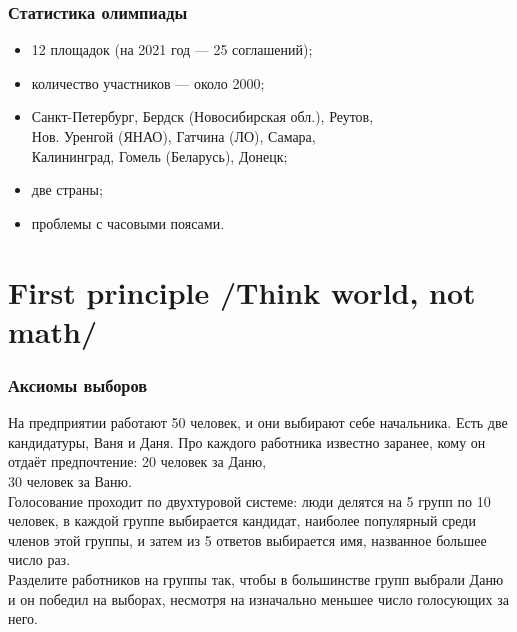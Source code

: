 \documentclass[aspectratio=1610,12pt]{beamer}
\def\uslx#1{\vspace{-6mm} \begin{block}{\vspace*{-3ex}} #1 \end{block}}
\begin{document}
\begin{frame}\frametitle{Статистика олимпиады}
\begin{itemize}
	\item 12 площадок (на 2021 год — 25 соглашений);\\
	\item количество участников --- около 2000;\\
	\item Санкт-Петербург, Бердск (Новосибирская обл.), Реутов, \\
		Нов. Уренгой (ЯНАО), Гатчина (ЛО), Самара, \\
		Калининград, Гомель (Беларусь), Донецк;\\
	\item две страны;\\
	\item проблемы с часовыми поясами.
\end{itemize}\end{frame}

\section[Мир]{First principle /Think world, not math/}

\begin{frame}
\frametitle{Аксиомы выборов}

\uslx{На предприятии работают 50 человек, и они выбирают себе начальника. Есть две кандидатуры, Ваня и Даня. Про каждого работника известно заранее, кому он отдаёт предпочтение: 20 человек за Даню,\\ 30 человек за Ваню. \smallskip \\
Голосование проходит по двухтуровой системе: люди делятся на 5 групп по 10 человек, в каждой группе выбирается кандидат, наиболее популярный среди членов этой группы, и затем из 5 ответов выбирается имя, названное большее число раз. \smallskip \\
Разделите работников на группы так, чтобы в большинстве групп выбрали Даню и он победил на выборах, несмотря на изначально меньшее число голосующих за него.}
\end{frame}
\end{document}
